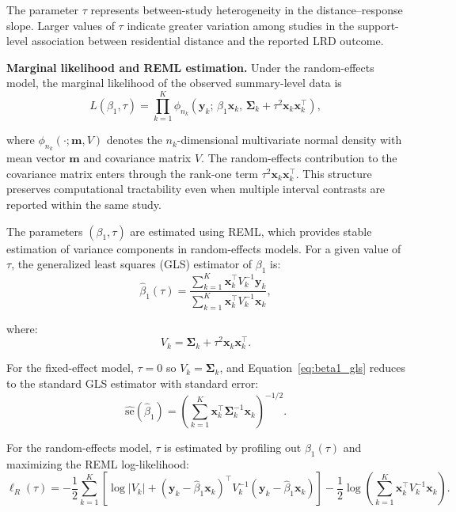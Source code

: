 \documentclass[journal=rsm]{CUP-JNL-DTM}%
\theoremstyle{definition}
\numberwithin{equation}{section}
\begin{document}
The parameter $\tau$ represents between-study heterogeneity in the
distance--response slope. Larger values of $\tau$ indicate greater variation
among studies in the support-level association between residential distance and the reported
LRD outcome.

\noindent\textbf{Marginal likelihood and REML estimation.} 
Under the random-effects model, the marginal likelihood of the observed summary-level data is 
\[ L(\beta_1,\tau) = \prod_{k=1}^{K} \phi_{n_k} \left( \mathbf{y}_k;\, \beta_1 \mathbf{x}_k,\, \boldsymbol{\Sigma}_k + \tau^2 \mathbf{x}_k \mathbf{x}_k^\top \right), 
\]

where $\phi_{n_k}(\cdot;\mathbf{m},V)$ denotes the $n_k$-dimensional multivariate normal density with mean vector $\mathbf{m}$ and covariance matrix $V$. The random-effects contribution to the covariance matrix enters through the rank-one term $\tau^2 \mathbf{x}_k \mathbf{x}_k^\top$. This structure preserves computational tractability even when multiple interval contrasts are reported within the same study.


The parameters $(\beta_1, \tau)$ are estimated using REML, which provides stable estimation of variance components in random-effects models. For a given value of $\tau$, the generalized least squares (GLS) estimator of $\beta_1$ is:
%
\begin{equation}
  \hat{\beta}_1(\tau)
  = \frac{
      \sum_{k=1}^K \mathbf{x}_k^\top V_k^{-1} \mathbf{y}_k
    }{
      \sum_{k=1}^K \mathbf{x}_k^\top V_k^{-1} \mathbf{x}_k
    },
  \label{eq:beta1_gls}
\end{equation}

%
where:
\[
  V_k = \boldsymbol{\Sigma}_k + \tau^2 \mathbf{x}_k \mathbf{x}_k^\top.
\]

For the fixed-effect model, $\tau = 0$ so $V_k = \boldsymbol{\Sigma}_k$, and Equation~\eqref{eq:beta1_gls} reduces to the standard GLS estimator with standard error:
\[
  \widehat{\mathrm{se}}(\hat{\beta}_1)
  = \left(\sum_{k=1}^K \mathbf{x}_k^\top \boldsymbol{\Sigma}_k^{-1}
          \mathbf{x}_k\right)^{-1/2}.
\]

 For the random-effects model, $\tau$ is estimated by profiling out $\beta_1(\tau)$ and maximizing the REML log-likelihood:
%
\begin{equation}
  \ell_R(\tau)
  = -\frac{1}{2} \sum_{k=1}^K
    \left[
      \log |V_k|
      + (\mathbf{y}_k - \hat{\beta}_1 \mathbf{x}_k)^\top
        V_k^{-1}
        (\mathbf{y}_k - \hat{\beta}_1 \mathbf{x}_k)
    \right]
    - \frac{1}{2}
      \log\!\left(
        \sum_{k=1}^K \mathbf{x}_k^\top V_k^{-1} \mathbf{x}_k
      \right).
  \label{eq:reml_loglik}
\end{equation}
\end{document}
